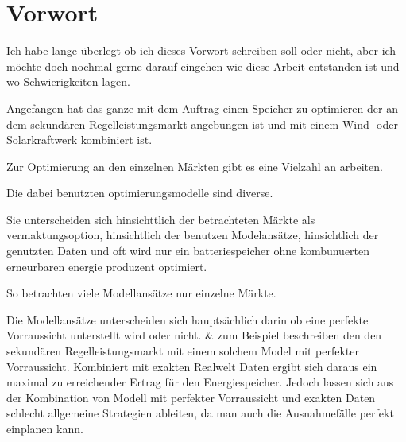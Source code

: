 \chapter*{Vorwort}

Ich habe lange überlegt ob ich dieses Vorwort schreiben soll oder nicht, aber ich möchte doch nochmal gerne
darauf eingehen wie diese Arbeit entstanden ist und wo Schwierigkeiten lagen.

Angefangen hat das ganze mit dem Auftrag einen Speicher zu optimieren der an dem sekundären Regelleistungsmarkt angebungen ist und mit einem Wind- oder
Solarkraftwerk kombiniert ist.

Zur Optimierung an den einzelnen Märkten gibt es eine Vielzahl an arbeiten.

Die dabei benutzten optimierungsmodelle sind diverse.

Sie unterscheiden sich hinsichttlich der betrachteten Märkte als vermaktungsoption, hinsichtlich der benutzen Modelansätze, hinsichtlich der genutzten Daten und oft wird nur ein
batteriespeicher ohne kombunuerten erneurbaren energie produzent optimiert.

So betrachten viele Modellansätze nur einzelne Märkte. 


Die Modellansätze unterscheiden sich hauptsächlich darin ob eine perfekte Vorraussicht unterstellt wird oder nicht. \cite{Nitsch.2021} \& \cite{Olk.2019}
zum Beispiel beschreiben den den sekundären Regelleistungsmarkt mit einem solchem Model mit perfekter Vorraussicht. Kombiniert mit exakten Realwelt Daten
ergibt sich daraus ein maximal zu erreichender Ertrag für den Energiespeicher. Jedoch lassen sich aus der Kombination
von Modell mit perfekter Vorraussicht und exakten Daten schlecht allgemeine Strategien ableiten, da man auch die Ausnahmefälle
perfekt einplanen kann.

